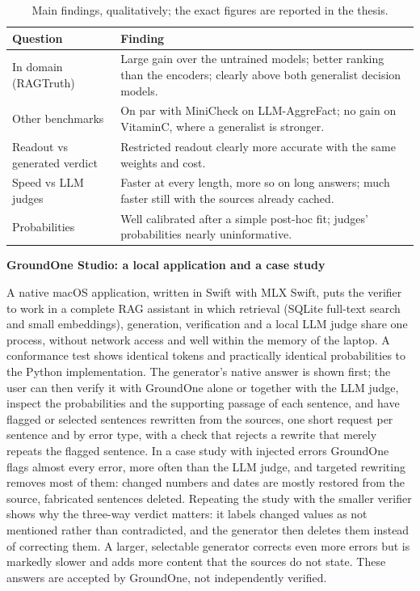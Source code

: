 \documentclass[11pt,a4paper]{article}
\newcommand{\sect}[1]{\par\medskip\noindent\textbf{\large #1}\par\smallskip}
\begin{document}
\begin{table}[h]
\centering
\small
\begin{tabular}{>{\raggedright\arraybackslash}p{6.6cm}>{\raggedright\arraybackslash}p{8.4cm}}
\toprule
Question & Finding \\
\midrule
In domain (RAGTruth) & Large gain over the untrained models; better ranking than the encoders; clearly above both generalist decision models. \\
Other benchmarks & On par with MiniCheck on LLM-AggreFact; no gain on VitaminC, where a generalist is stronger. \\
Readout vs generated verdict & Restricted readout clearly more accurate with the same weights and cost. \\
Speed vs LLM judges & Faster at every length, more so on long answers; much faster still with the sources already cached. \\
Probabilities & Well calibrated after a simple post-hoc fit; judges' probabilities nearly uninformative. \\
\bottomrule
\end{tabular}
\caption{Main findings, qualitatively; the exact figures are reported in the thesis.}
\label{tab:results}
\end{table}

\sect{GroundOne Studio: a local application and a case study}
A native macOS application, written in Swift with MLX Swift, puts the verifier to work in a complete RAG assistant in which
retrieval (SQLite full-text search and small embeddings), generation, verification and a local LLM judge share one process,
without network access and well within the memory of the laptop. A conformance test shows identical tokens and
practically identical probabilities to the Python implementation. The generator's native answer is shown first; the user
can then verify it with GroundOne alone or together with the LLM judge, inspect the probabilities and the supporting
passage of each sentence, and have flagged or selected sentences rewritten from the sources, one short request per
sentence and by error type, with a check that rejects a rewrite that merely repeats the flagged sentence. In a case study
with injected errors GroundOne flags almost every error, more often than the LLM judge, and targeted rewriting removes
most of them: changed numbers and dates are mostly restored from the source, fabricated sentences deleted. Repeating the
study with the smaller verifier shows why the three-way verdict matters: it labels changed values as not mentioned rather
than contradicted, and the generator then deletes them instead of correcting them. A larger, selectable generator corrects
even more errors but is markedly slower and adds more content that the sources do not state. These answers are accepted
by GroundOne, not independently verified.
\end{document}
